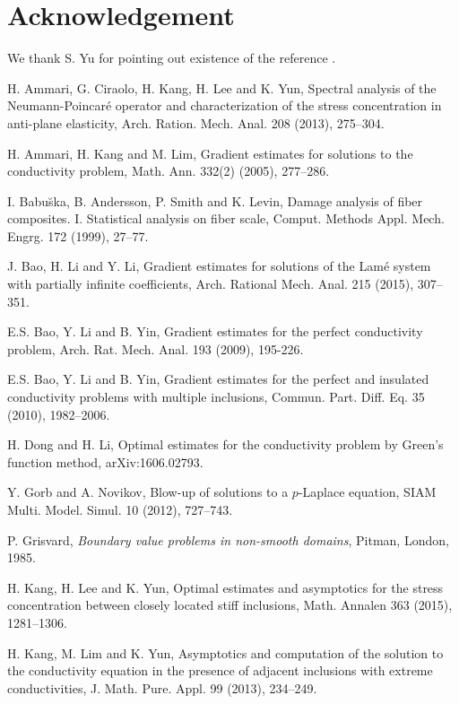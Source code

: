 \documentclass[11pt,a4paper]{article}
\numberwithin{equation}{section}
\begin{document}
\section*{Acknowledgement}
We thank S. Yu for pointing out existence of the reference \cite{PBFLN}.


\begin{thebibliography}{99}

 H. Ammari, G. Ciraolo, H. Kang, H. Lee and K. Yun, Spectral analysis of the Neumann-Poincar\'e operator and characterization of the stress concentration in anti-plane elasticity, Arch. Ration. Mech. Anal. 208 (2013), 275--304.

 H. Ammari, H. Kang and M. Lim, Gradient estimates for solutions to the conductivity problem, Math. Ann. 332(2) (2005), 277--286.

 I. Babu\u{s}ka, B. Andersson, P. Smith and K. Levin, Damage analysis of fiber composites. I. Statistical
analysis on fiber scale, Comput. Methods Appl. Mech. Engrg. 172 (1999), 27--77.

 J. Bao, H. Li and Y. Li, Gradient estimates for solutions of the Lam\'e
system with partially infinite coefficients, Arch. Rational Mech. Anal. 215 (2015), 307--351.

  E.S. Bao, Y. Li and B. Yin,
Gradient estimates for the perfect conductivity problem, Arch. Rat. Mech. Anal. 193 (2009), 195-226.

 E.S. Bao, Y. Li and B. Yin,
Gradient estimates for the perfect and insulated conductivity problems with multiple inclusions, Commun. Part. Diff. Eq. 35 (2010), 1982--2006.

 H. Dong and H. Li, Optimal estimates for the conductivity problem by Green's function method, arXiv:1606.02793.

 Y. Gorb and A. Novikov, Blow-up of solutions to a $p$-Laplace equation, SIAM Multi. Model. Simul. 10 (2012), 727--743.

 P. Grisvard, {\sl Boundary value problems in non-smooth domains}, Pitman,
London, 1985.

 H. Kang, H. Lee and K. Yun, Optimal estimates and asymptotics for the stress concentration between closely located stiff inclusions, Math. Annalen 363 (2015), 1281--1306.

 H. Kang, M. Lim and K. Yun, Asymptotics and computation of the solution to the conductivity
equation in the presence of adjacent inclusions with extreme conductivities, {J. Math. Pure. Appl.} 99 (2013), 234--249.


\end{thebibliography}
\end{document}
